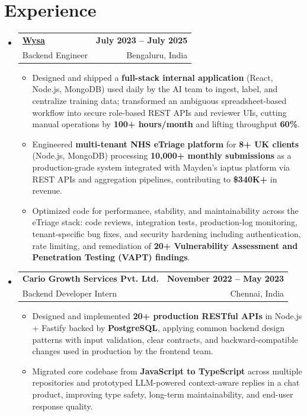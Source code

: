 \documentclass[letterpaper,10pt]{article}
\makeatletter
\newcommand{\resumeItem}[1]{
  \item\small{#1\vspace{-1pt}}
}
\newcommand{\resumeSubheading}[4]{
  \vspace{1pt}\item
    \begin{tabular*}{0.985\textwidth}[t]{l@{\extracolsep{\fill}}r}
      \textbf{#1} & \textbf{\small #2} \\
      {\small\color{ResumeSlate} #3} & {\small\color{ResumeSlate} #4} \\
    \end{tabular*}\vspace{-6pt}
}
\newcommand{\resumeSubHeadingListStart}{\begin{itemize}[leftmargin=0.0in, label={}, itemsep=2pt, topsep=2pt]}
\newcommand{\resumeSubHeadingListEnd}{\end{itemize}}
\newcommand{\resumeItemListStart}{\begin{itemize}[leftmargin=0.18in, itemsep=2pt, topsep=1pt]}
\newcommand{\resumeItemListEnd}{\end{itemize}\vspace{-4pt}}
\makeatother
\begin{document}
\section{Experience}
\resumeSubHeadingListStart
  \resumeSubheading
    {\href{https://www.wysa.io}{Wysa}}{July 2023 -- July 2025}
    {Backend Engineer}{Bengaluru, India}
    \resumeItemListStart
      \resumeItem{Designed and shipped a \textbf{full-stack internal application} (React, Node.js, MongoDB) used daily by the AI team to ingest, label, and centralize training data; transformed an ambiguous spreadsheet-based workflow into secure role-based REST APIs and reviewer UIs, cutting manual operations by \textbf{100+ hours/month} and lifting throughput \textbf{60\%}.}
      \resumeItem{Engineered \textbf{multi-tenant NHS eTriage platform} for \textbf{8+ UK clients} (Node.js, MongoDB) processing \textbf{10{,}000+ monthly submissions} as a production-grade system integrated with Mayden's iaptus platform via REST APIs and aggregation pipelines, contributing to \textbf{\$340K+} in revenue.}
      \resumeItem{Optimized code for performance, stability, and maintainability across the eTriage stack: code reviews, integration tests, production-log monitoring, tenant-specific bug fixes, and security hardening including authentication, rate limiting, and remediation of \textbf{20+ Vulnerability Assessment and Penetration Testing (VAPT) findings}.}
    \resumeItemListEnd
  \resumeSubheading
    {Cario Growth Services Pvt. Ltd.}{November 2022 -- May 2023}
    {Backend Developer Intern}{Chennai, India}
    \resumeItemListStart
      \resumeItem{Designed and implemented \textbf{20+ production RESTful APIs} in Node.js + Fastify backed by \textbf{PostgreSQL}, applying common backend design patterns with input validation, clear contracts, and backward-compatible changes used in production by the frontend team.}
      \resumeItem{Migrated core codebase from \textbf{JavaScript to TypeScript} across multiple repositories and prototyped LLM-powered context-aware replies in a chat product, improving type safety, long-term maintainability, and end-user response quality.}
    \resumeItemListEnd
\resumeSubHeadingListEnd
\vspace{-4pt}
\end{document}
